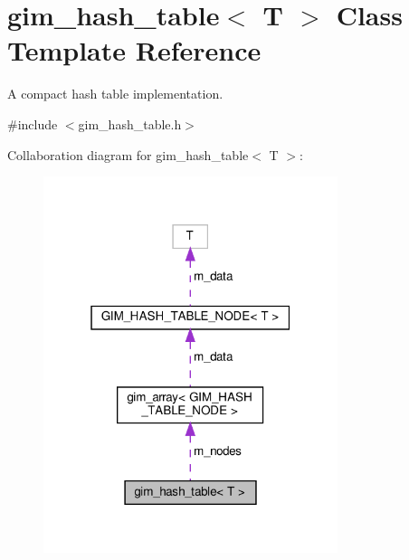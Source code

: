 \hypertarget{classgim__hash__table}{}\section{gim\+\_\+hash\+\_\+table$<$ T $>$ Class Template Reference}
\label{classgim__hash__table}


A compact hash table implementation.  




{\ttfamily \#include $<$gim\+\_\+hash\+\_\+table.\+h$>$}



Collaboration diagram for gim\+\_\+hash\+\_\+table$<$ T $>$\+:
\nopagebreak
\begin{figure}[H]
\begin{center}
\leavevmode
\includegraphics[width=244pt]{classgim__hash__table__coll__graph}
\end{center}
\end{figure}
